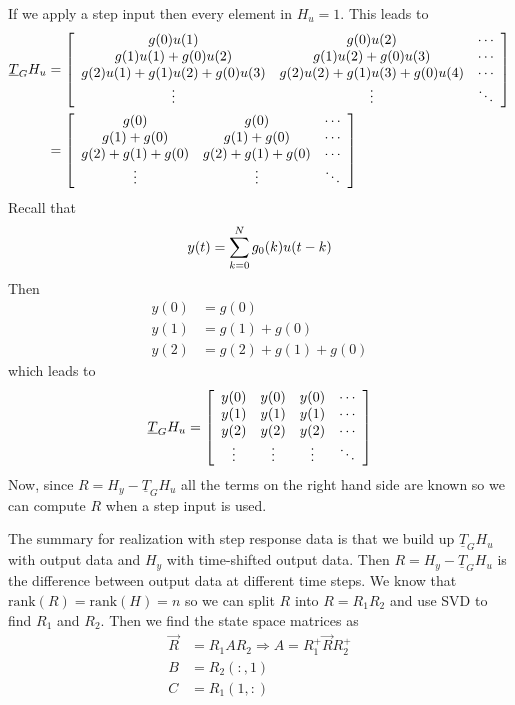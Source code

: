 \documentclass[lecture,12pt,]{pcms-l}
\begin{document}
If we apply a step input then every element in $H_u = 1$. This leads to
\begin{align*}
\underline{T}_GH_u &= \left[\begin{array}{c c c}
g(0)u(1) & g(0)u(2) & \cdots \\
g(1)u(1)+g(0)u(2) & g(1)u(2)+g(0)u(3) & \cdots \\
g(2)u(1)+g(1)u(2)+g(0)u(3) & g(2)u(2)+g(1)u(3)+g(0)u(4) & \cdots \\
\vdots & \vdots & \ddots
\end{array}\right] \\
&= \left[\begin{array}{c c c}
g(0) & g(0) & \cdots \\
g(1)+g(0) & g(1)+g(0) & \cdots \\
g(2)+g(1)+g(0) & g(2)+g(1)+g(0) & \cdots \\
\vdots & \vdots & \ddots
\end{array}\right]
\end{align*}
Recall that
$$y(t)=\sum_{k=0}^N g_0(k)u(t-k)$$
Then
\begin{align*}
y(0) &= g(0) \\
y(1) &= g(1) + g(0) \\
y(2) &= g(2) + g(1) + g(0)
\end{align*}
which leads to
\begin{align*}
\underline{T}_GH_u = \left[\begin{array}{c c c c}
y(0) & y(0) & y(0) & \cdots \\
y(1) & y(1) & y(1) & \cdots \\
y(2) & y(2) & y(2) & \cdots \\
\vdots & \vdots & \vdots & \ddots
\end{array}\right]
\end{align*}
Now, since $R=H_y-\underline{T}_GH_u$ all the terms on the right hand side are known so we can compute $R$ when a step input is used.

The summary for realization with step response data is that we build up $\underline{T}_GH_u$ with output data and $H_y$ with time-shifted output data. Then $R=H_y-\underline{T}_GH_u$ is the difference between output data at different time steps. We know that $\text{rank}(R)=\text{rank}(H)=n$ so we can split $R$ into $R=R_1R_2$ and use SVD to find $R_1$ and $R_2$. Then we find the state space matrices as
\begin{align*}
\vec{R} &= R_1AR_2 \Rightarrow A=R_1^+\vec{R}R_2^+ \\
B &= R_2(:,1) \\
C &= R_1(1,:)
\end{align*}
\end{document}
